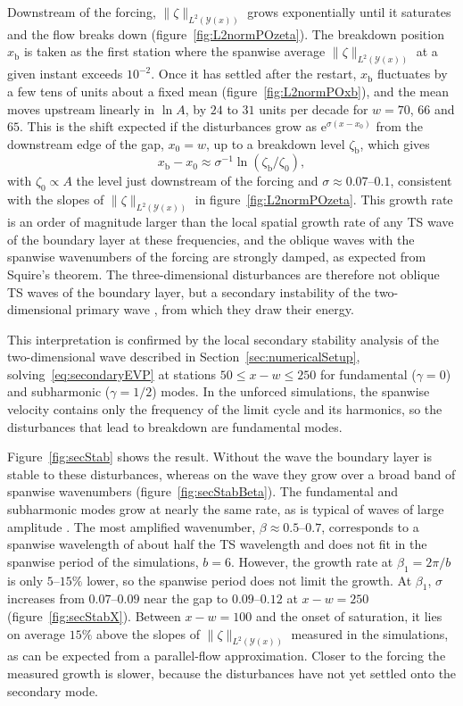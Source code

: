 \documentclass[lineno]{jfm}
\begin{document}
Downstream of the forcing, $\|\zeta\|_{L^2(\mathcal{Y}(x))}$ grows exponentially until it saturates and the flow breaks down (figure~\ref{fig:L2normPOzeta}). The breakdown position $x_\mathrm{b}$ is taken as the first station where the spanwise average $\|\zeta\|_{L^2(\mathcal{Y}(x))}$ at a given instant exceeds $10^{-2}$. Once it has settled after the restart, $x_\mathrm{b}$ fluctuates by a few tens of units about a fixed mean (figure~\ref{fig:L2normPOxb}), and the mean moves upstream linearly in $\ln A$, by $24$ to $31$ units per decade for $w=70$, $66$ and $65$. This is the shift expected if the disturbances grow as $\mathrm{e}^{\sigma(x-x_0)}$ from the downstream edge of the gap, $x_0=w$, up to a breakdown level $\zeta_\mathrm{b}$, which gives
\begin{equation}\label{eq:breakdownPosition}
	x_\mathrm{b}-x_0\approx\sigma^{-1}\ln(\zeta_\mathrm{b}/\zeta_0),
\end{equation}
with $\zeta_0\propto A$ the level just downstream of the forcing and $\sigma\approx0.07$--$0.1$, consistent with the slopes of $\|\zeta\|_{L^2(\mathcal{Y}(x))}$ in figure~\ref{fig:L2normPOzeta}. This growth rate is an order of magnitude larger than the local spatial growth rate of any \ac{TS} wave of the boundary layer at these frequencies, and the oblique waves with the spanwise wavenumbers of the forcing are strongly damped, as expected from Squire's theorem. The three-dimensional disturbances are therefore not oblique \ac{TS} waves of the boundary layer, but a secondary instability of the two-dimensional primary wave \citep{herbert1988}, from which they draw their energy.

This interpretation is confirmed by the local secondary stability analysis of the two-dimensional wave described in Section~\ref{sec:numericalSetup}, solving~\eqref{eq:secondaryEVP} at stations $50\leq x-w\leq250$ for fundamental ($\gamma=0$) and subharmonic ($\gamma=1/2$) modes. In the unforced simulations, the spanwise velocity contains only the frequency of the limit cycle and its harmonics, so the disturbances that lead to breakdown are fundamental modes.

Figure~\ref{fig:secStab} shows the result. Without the wave the boundary layer is stable to these disturbances, whereas on the wave they grow over a broad band of spanwise wavenumbers (figure~\ref{fig:secStabBeta}). The fundamental and subharmonic modes grow at nearly the same rate, as is typical of waves of large amplitude \citep{herbert1988}. The most amplified wavenumber, $\beta\approx0.5$--$0.7$, corresponds to a spanwise wavelength of about half the \ac{TS} wavelength and does not fit in the spanwise period of the simulations, $b=6$. However, the growth rate at $\beta_1=2\pi/b$ is only $5$--$15\%$ lower, so the spanwise period does not limit the growth. At $\beta_1$, $\sigma$ increases from $0.07$--$0.09$ near the gap to $0.09$--$0.12$ at $x-w=250$ (figure~\ref{fig:secStabX}). Between $x-w=100$ and the onset of saturation, it lies on average $15\%$ above the slopes of $\|\zeta\|_{L^2(\mathcal{Y}(x))}$ measured in the simulations, as can be expected from a parallel-flow approximation. Closer to the forcing the measured growth is slower, because the disturbances have not yet settled onto the secondary mode.
\end{document}
